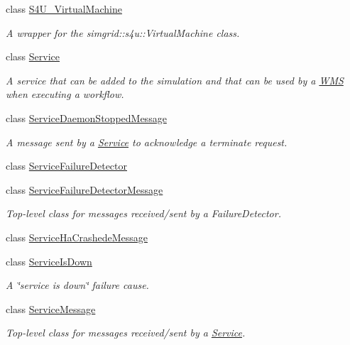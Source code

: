\begin{DoxyCompactItemize}
class \hyperlink{classwrench_1_1_s4_u___virtual_machine}{S4\+U\+\_\+\+Virtual\+Machine}
\begin{DoxyCompactList}\small\item\em A wrapper for the simgrid\+::s4u\+::\+Virtual\+Machine class. \end{DoxyCompactList}\item 
class \hyperlink{classwrench_1_1_service}{Service}
\begin{DoxyCompactList}\small\item\em A service that can be added to the simulation and that can be used by a \hyperlink{classwrench_1_1_w_m_s}{W\+MS} when executing a workflow. \end{DoxyCompactList}\item 
class \hyperlink{classwrench_1_1_service_daemon_stopped_message}{Service\+Daemon\+Stopped\+Message}
\begin{DoxyCompactList}\small\item\em A message sent by a \hyperlink{classwrench_1_1_service}{Service} to acknowledge a terminate request. \end{DoxyCompactList}\item 
class \hyperlink{classwrench_1_1_service_failure_detector}{Service\+Failure\+Detector}
\item 
class \hyperlink{classwrench_1_1_service_failure_detector_message}{Service\+Failure\+Detector\+Message}
\begin{DoxyCompactList}\small\item\em Top-\/level class for messages received/sent by a Failure\+Detector. \end{DoxyCompactList}\item 
class \hyperlink{classwrench_1_1_service_ha_crashede_message}{Service\+Ha\+Crashede\+Message}
\item 
class \hyperlink{classwrench_1_1_service_is_down}{Service\+Is\+Down}
\begin{DoxyCompactList}\small\item\em A \char`\"{}service is down\char`\"{} failure cause. \end{DoxyCompactList}\item 
class \hyperlink{classwrench_1_1_service_message}{Service\+Message}
\begin{DoxyCompactList}\small\item\em Top-\/level class for messages received/sent by a \hyperlink{classwrench_1_1_service}{Service}. \end{DoxyCompactList}\item 

\end{DoxyCompactItemize}
